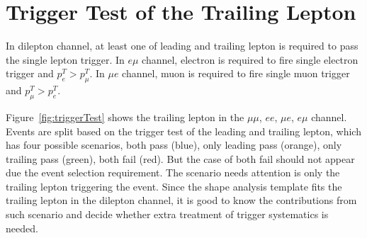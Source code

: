 \section{Trigger Test of the Trailing Lepton}

In dilepton channel, at least one of leading and trailing lepton is 
required to pass the single lepton trigger.
In $e\mu$ channel, electron is required to fire single electron trigger and $p^T_e>p^T_\mu$.
In $\mu e$ channel, muon is required to fire single muon trigger and $p^T_\mu>p^T_e$.


Figure~\ref{fig:triggerTest} shows the trailing lepton \pt in the $\mu\mu$, $ee$, $\mu e$, $e\mu$ channel.
Events are split based on the trigger test of the leading and trailing lepton, which has four possible
scenarios, both pass (blue), only leading pass (orange), only trailing pass (green), both fail (red).
But the case of both fail should not appear due the event selection requirement. The scenario needs
attention is only the trailing lepton triggering the event. Since the shape analysis template fits the
trailing lepton \pt in the dilepton channel, it is good to know the contributions from such scenario and
decide whether extra treatment of trigger systematics is needed.


